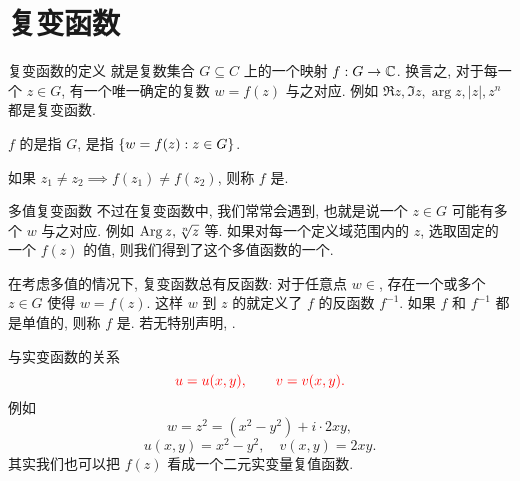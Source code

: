 \section{复变函数}


\begin{frame}{复变函数的定义}
\onslide<+->
就是复数集合 $G\subseteq C$ 上的一个映射 $f:G\to {\mathbb{C}}$.
\onslide<+->
换言之, 对于每一个 $z\in G$, 有一个唯一确定的复数 $w=f(z)$ 与之对应.
\onslide<+->
例如 $\Re z,\Im z,\arg z,|z|,z^n$ 都是复变函数.

\onslide<+->
$f$ 的是指 $G$, 是指 ${\left\{w=f(z):z\in G\right\}}$.

\onslide<+->
如果 $z_1\neq z_2\implies f(z_1)\neq f(z_2)$, 则称 $f$ 是.
\end{frame}


\begin{frame}{多值复变函数}
\onslide<+->
不过在复变函数中, 我们常常会遇到, 也就是说一个 $z\in G$ 可能有多个 $w$ 与之对应.
\onslide<+->
例如 $\operatorname{Arg} z,\sqrt[n]z$ 等.
\onslide<+->
如果对每一个定义域范围内的 $z$, 选取固定的一个 $f(z)$ 的值, 则我们得到了这个多值函数的一个.

\onslide<+->
在考虑多值的情况下, 复变函数总有反函数:
\onslide<+->
对于任意点 $w\in $, 存在一个或多个 $z\in G$ 使得 $w=f(z)$.
\onslide<+->
这样 $w$ 到 $z$ 的就定义了 $f$ 的反函数 $f^{-1}$.
\onslide<+->
如果 $f$ 和 $f^{-1}$ 都是单值的, 则称 $f$ 是.
\onslide<+->
若无特别声明, .
\end{frame}


\begin{frame}{与实变函数的关系}
\onslide<+->
\[{\color{red}{u=u(x,y),\qquad v=v(x,y).}}\]
\onslide<+->
例如
\[w=z^2=(x^2-y^2)+i\cdot 2xy,\]
\[u(x,y)=x^2-y^2,\quad v(x,y)=2xy.\]
\onslide<+->
其实我们也可以把 $f(z)$ 看成一个二元实变量复值函数.
\end{frame}



